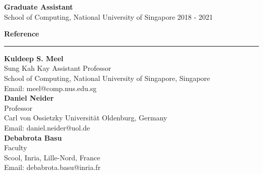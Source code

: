 \documentclass[a4paper,10pt,final]{article}
\newcommand{\Sep}{\vspace{1.5em}}
\newcommand{\SmallSep}{\vspace{0.5em}}
\begin{document}
\SmallSep
\textbf{Graduate Assistant}\\
School of Computing, National University of Singapore \hspace*{\fill} 2018  - 2021

\Sep
\Large{\textbf{Reference}}\\
\noindent\rule{\textwidth}{1pt}
\normalsize
\textbf{Kuldeep S. Meel}\\
Sung Kah Kay Assistant Professor\\ 
School of Computing, National University of Singapore, Singapore\\
Email: meel@comp.nus.edu.sg\\

\textbf{Daniel Neider}\\
Professor\\
Carl von Ossietzky Universit\"at Oldenburg, Germany\\
Email: daniel.neider@uol.de\\

\textbf{Debabrota Basu}\\
Faculty\\
Scool, Inria, Lille-Nord, France\\
Email: debabrota.basu@inria.fr\\
\end{document}
